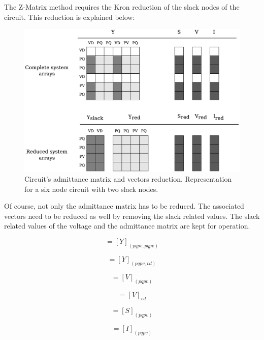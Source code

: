 \documentclass[nols,a4paper,twoside,notoc,fleqn]{tufte-book}
\begin{document}
The Z-Matrix method requires the Kron reduction of the slack nodes of the circuit. This reduction is explained below:

\begin{figure}[h!]
  \includegraphics[width=\linewidth]{img/Matrix_reduction.eps}
  \caption{Circuit's admittance matrix and vectors reduction. Representation for a six node circuit with two slack nodes.}
  \label{fig:reduction}
\end{figure}

Of course, not only the admittance matrix has to be reduced. The associated vectors need to be reduced as well by removing the slack related values. The slack related values of the voltage and the admittance matrix are kept for operation. 

\begin{equation}
[Y_{red}] = [Y]_{(pqpv, pqpv)}
\end{equation}

\begin{equation}
[Y_{slack}] = [Y]_{(pqpv, vd)}
\end{equation}

\begin{equation}
[V_{red}] = [V]_{(pqpv)}
\end{equation}

\begin{equation}
[V_{slack}] = [V]_{vd}
\end{equation}

\begin{equation}
[S_{red}] = [S]_{(pqpv)}
\end{equation}

\begin{equation}
[I_{red}] = [I]_{(pqpv)}
\end{equation}
\end{document}
